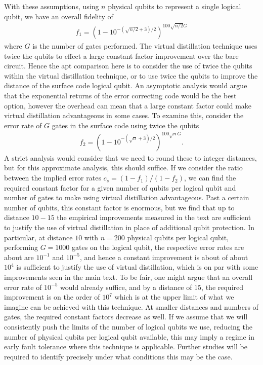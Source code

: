 \documentclass[
amsmath,
amssymb,
aps,
pra,
reprint,
twocolumn,
superscriptaddress,
longbibliography,
showkeys,
floatfix
]{revtex4-1}
\begin{document}
With these assumptions, using $n$ physical qubits to represent a single logical
qubit, we have an overall fidelity of
\begin{align}
  f_1 = \left( 1 - 10^{-(\sqrt{n/2} + 3)/2} \right)^{100 \sqrt{n/2} G}
\end{align}
where $G$ is the number of gates performed. 
The virtual distillation technique uses twice the qubits to effect a large constant
factor improvement over the bare circuit. 
Hence the apt comparison here is to consider the use of twice the qubits within
the virtual distillation technique, or to use twice the qubits to improve the
distance of the surface code logical qubit. 
An asymptotic analysis would argue that the exponential returns of the error
correcting code would be the best option, however the overhead can mean that a
large constant factor could make virtual distillation advantageous in some cases. 
To examine this, consider the error rate of $G$ gates in the surface code using
twice the qubits
\begin{align}
  f_2 = \left( 1 - 10^{-(\sqrt{n} + 3)/2} \right)^{100 \sqrt{n} G}.
\end{align}
A strict analysis would consider that we need to round these to integer distances, 
but for this approximate analysis, this should suffice.  
If we consider the ratio between the implied error rates $c_s = (1-f_1) /
(1-f_2)$, we can find the required constant factor for a given number of qubits
per logical qubit and number of gates to make using virtual distillation
advantageous. 
Past a certain number of qubits, this constant factor is enormous, but we find
that up to distance $10-15$ the empirical improvements measured in the text are
sufficient to justify the use of virtual distillation in place of additional qubit
protection.  
In particular, at distance $10$ with $n=200$ physical qubits per logical qubit, 
performing $G=1000$ gates on the logical qubit, the respective error rates 
are about are $10^{-1}$ and $10^{-5}$, and hence a constant improvement is 
about of about $10^4$ is sufficient to justify the use of virtual distillation, 
which is on par with some improvements seen in the main text.  
To be fair, one might argue that an overall error rate of $10^{-5}$ would already suffice, 
and by a distance of $15$, the required improvement is on the order of $10^7$ 
which is at the upper limit of what we imagine can be achieved with this technique.
At smaller distances and numbers of gates, the required constant factors decrease as well.
If we assume that we will consistently push the limits of the number of logical
qubits we use, reducing the number of physical qubits per logical qubit
available, this may imply a regime in early fault tolerance where this technique
is applicable.
Further studies will be required to identify precisely under what conditions
this may be the case.
\end{document}
